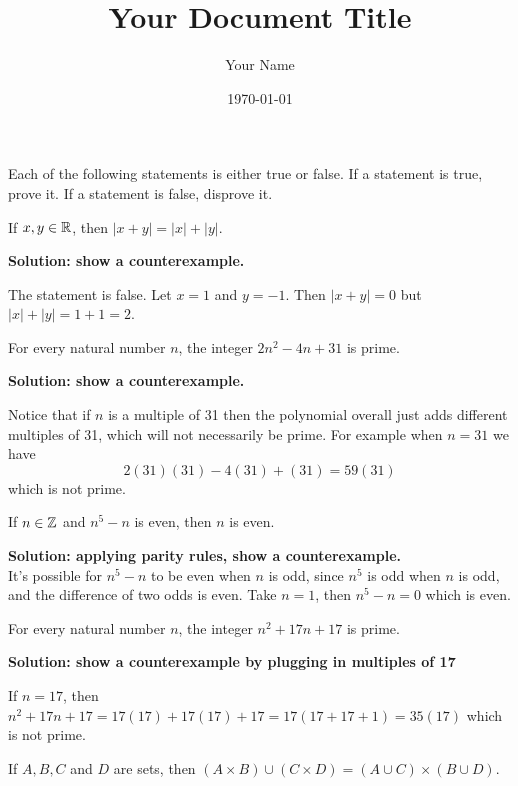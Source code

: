 \documentclass{article}
\title{Your Document Title}
\author{Your Name}
\date{\today} %
\begin{document}
\maketitle

Each of the following statements is either true or false. If a statement is true, prove it. If a statement is false, disprove it.

\begin{problem}
If $x, y \in \mathbb{R}$, then $|x + y| = |x| + |y|$.
\end{problem}

\textbf{Solution: show a counterexample.}

The statement is false. Let $x = 1$ and $y = -1$. Then $|x + y| = 0$ but $|x| + |y| = 1 + 1 = 2$.

\begin{problem}
For every natural number $n$, the integer $2n^2 - 4n + 31$ is prime.
\end{problem}

\textbf{Solution: show a counterexample.}

Notice that if $n$ is a multiple of 31 then the polynomial overall just adds different multiples of 31, which will not necessarily be prime. For example when $n = 31$ we have
$$2(31)(31) - 4(31) + (31) = 59(31)$$
which is not prime.

\begin{problem}
If $n \in \mathbb{Z}$ and $n^5 - n$ is even, then $n$ is even.
\end{problem}

\textbf{Solution: applying parity rules, show a counterexample.}
\\
It's possible for $n^5 - n$ to be even when $n$ is odd, since $n^5$ is odd when $n$ is odd, and the difference of two odds is even. Take $n = 1$, then $n^5 - n = 0$ which is even.

\begin{problem}
For every natural number $n$, the integer $n^2 + 17n + 17$ is prime.
\end{problem}

\textbf{Solution: show a counterexample by plugging in multiples of 17}

If $n = 17$, then $n^2 + 17n + 17 = 17(17) + 17(17) + 17 = 17(17 + 17 + 1) = 35(17)$ which is not prime.

\begin{problem}
If $A, B, C$ and $D$ are sets, then $(A \times B) \cup (C \times D) = (A \cup C) \times (B \cup D)$.
\end{problem}
\end{document}
